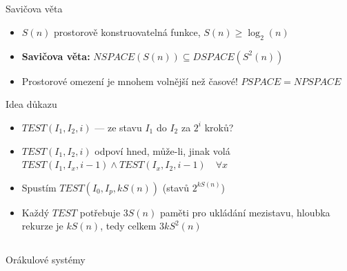\documentclass{beamer}
\begin{document}
\subsection{}
\begin{frame}{Savičova věta}
\begin{itemize}
\item $S(n)$ prostorově konstruovatelná funkce, $S(n) \ge \log_2(n)$
\item {\bf Savičova věta:} $NSPACE(S(n)) \subseteq DSPACE(S^2(n))$
\item Prostorové omezení je mnohem volnější než časové! $PSPACE=NPSPACE$
\end{itemize}
\begin{block}{Idea důkazu}
\begin{itemize}
\item $TEST(I_1,I_2,i)$ --- ze stavu $I_1$ do $I_2$ za $2^i$ kroků?
\item $TEST(I_1,I_2,i)$ odpoví hned, může-li, jinak volá $TEST(I_1,I_x,i-1) \land TEST(I_x, I_2, i-1) \quad \forall x$
\item Spustím $TEST(I_0, I_p, kS(n))$ (stavů $2^{kS(n)}$)
\item Každý $TEST$ potřebuje $3S(n)$ paměti pro ukládání mezistavu, hloubka rekurze je $kS(n)$, tedy celkem $3kS^2(n)$
\end{itemize}
\end{block}
\end{frame}

\subsection{}
\begin{frame}{Orákulové systémy}
\end{frame}
\end{document}
